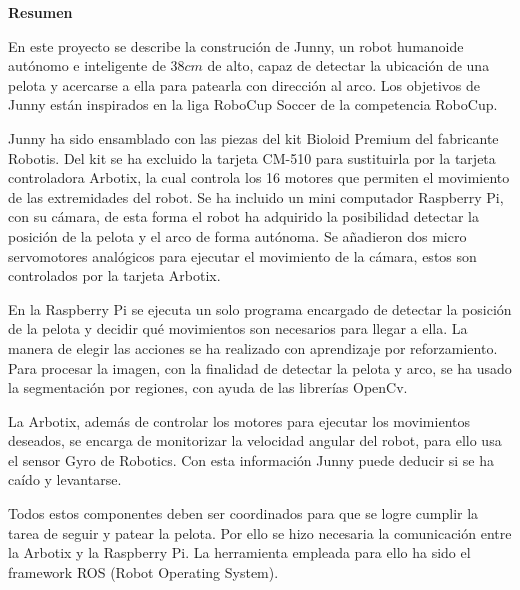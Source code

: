 \setcounter{page}{4}
\begin{center}
	{\bf Resumen}  %
\end{center}	


En este proyecto se describe la construción de Junny, un robot humanoide autónomo e inteligente de $38 cm $ de alto, capaz de detectar la ubicación de una pelota y acercarse a ella para patearla con dirección al arco. Los objetivos de Junny están inspirados en la liga RoboCup Soccer de la competencia RoboCup.

Junny ha sido ensamblado con las piezas del kit Bioloid Premium del fabricante Robotis. Del kit se ha excluido la tarjeta CM-510 para sustituirla por la tarjeta controladora Arbotix, la cual controla los 16 motores que permiten el movimiento de las extremidades del robot. Se ha incluido un mini computador Raspberry Pi, con su cámara, %
de esta forma el robot ha adquirido la posibilidad detectar la posición de la pelota y el arco de forma autónoma. Se añadieron dos micro servomotores analógicos para ejecutar el movimiento de la c\'amara, estos son controlados por la tarjeta Arbotix. 

En la Raspberry Pi se ejecuta un solo programa encargado de detectar la posición de la pelota y decidir qué movimientos son necesarios para llegar a ella. La manera de elegir las acciones se ha realizado con aprendizaje por reforzamiento. Para procesar la imagen, con la finalidad de detectar la pelota y arco, se ha usado la segmentaci\'on por regiones, con ayuda de las librerías OpenCv. %

La Arbotix, además de controlar los motores para ejecutar los movimientos deseados, se encarga de monitorizar la velocidad angular del robot, para ello usa el sensor Gyro de Robotics. Con esta información Junny puede deducir si se ha caído y levantarse. 

Todos estos componentes deben ser coordinados para que se logre cumplir la tarea de seguir y patear la pelota. Por ello se hizo necesaria la comunicación entre la Arbotix y la Raspberry Pi. La herramienta 
empleada para ello ha sido el \gls{framework} \gls{ROS} (Robot Operating System). %

